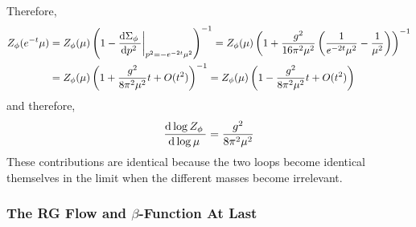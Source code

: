 \documentclass[12pt]{article}
\begin{document}
Therefore, 
\begin{align*}
Z_\phi(e^{-t} \mu) & = Z_\phi(\mu) \left(1 - \frac{\mathrm{d}\Sigma_\phi \:}{\mathrm{d}p^2 \:} \bigg|_{p^2 = - e^{-2t}\mu^2} \right)^{-1} = Z_\phi(\mu) \left( 1 + \frac{g^2}{16 \pi^2 \mu^2} \left( \frac{1}{e^{-2t} \mu^2} - \frac{1}{\mu^2} \right) \right)^{-1} 
\\
& = Z_\phi(\mu) \left( 1 + \frac{g^2}{8 \pi^2 \mu^2} t  + O(t^2) \right)^{-1} =  Z_\phi(\mu) \left( 1 - \frac{g^2}{8 \pi^2 \mu^2} t  + O(t^2) \right)
\end{align*}
and therefore,
\[ \frac{\mathrm{d}\log{Z_{\phi}} \:}{\mathrm{d}\log{\mu} \:} = \frac{g^2}{8 \pi^2 \mu^2} \]
These contributions are identical because the two loops become identical themselves in the limit when the different masses become irrelevant. 

\subsubsection{The RG Flow and $\beta$-Function At Last}
\end{document}
